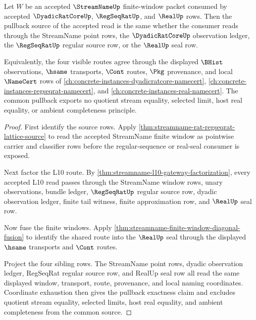 \begin{theorem}
\label{thm:streamname-dyadic-regseq-real-pullback-exactness}
Let $W$ be an accepted $\StreamNameUp$ finite-window packet consumed by accepted $\DyadicRatCoreUp$, $\RegSeqRatUp$, and $\RealUp$ rows. Then the pullback source of the accepted read is the same whether the consumer reads through the StreamName point rows, the $\DyadicRatCoreUp$ observation ledger, the $\RegSeqRatUp$ regular source row, or the $\RealUp$ seal row.

Equivalently, the four visible routes agree through the displayed $\BHist$ observations, $\hsame$ transports, $\Cont$ routes, $\Pkg$ provenance, and local $\NameCert$ rows of \autoref{ch:concrete-instances-dyadicratcore-namecert}, \autoref{ch:concrete-instances-regseqrat-namecert}, and \autoref{ch:concrete-instances-real-namecert}. The common pullback exports no quotient stream equality, selected limit, host real equality, or ambient completeness principle.
\end{theorem}
\begin{proof}
First identify the source rows. Apply \autoref{thm:streamname-rat-regseqrat-lattice-source} to read the accepted StreamName finite window as pointwise carrier and classifier rows before the regular-sequence or real-seal consumer is exposed.

Next factor the L10 route. By \autoref{thm:streamname-l10-gateway-factorization}, every accepted L10 read passes through the StreamName window rows, unary observations, bundle ledger, $\RegSeqRatUp$ regular source row, dyadic observation ledger, finite tail witness, finite approximation row, and $\RealUp$ seal row.

Now fuse the finite windows. Apply \autoref{thm:streamname-finite-window-diagonal-fusion} to identify the shared route into the $\RealUp$ seal through the displayed $\hsame$ transports and $\Cont$ routes.

Project the four sibling rows. The StreamName point rows, dyadic observation ledger, RegSeqRat regular source row, and RealUp seal row all read the same displayed window, transport, route, provenance, and local naming coordinates. Coordinate exhaustion then gives the pullback exactness claim and excludes quotient stream equality, selected limits, host real equality, and ambient completeness from the common source.
\end{proof}

